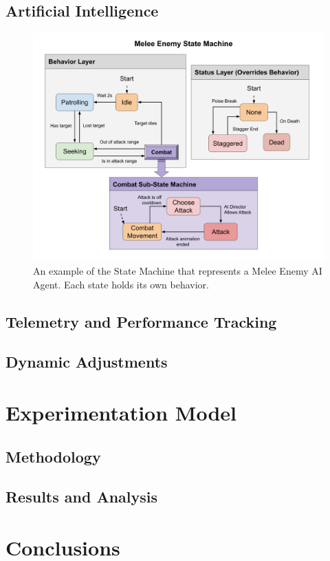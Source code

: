 \subsection{Artificial Intelligence}





\begin{figure}[!h]
    \caption{An example of the State Machine that represents a Melee Enemy AI Agent. Each state holds its own behavior.}
    \begin{center}
        \includegraphics[width=40em]{figures/fig-melee-ai-state-machine.png}
    \end{center}
    \label{fig:ex1}
\end{figure}

\subsection{Telemetry and Performance Tracking}

\subsection{Dynamic Adjustments}

\section{Experimentation Model}

\subsection{Methodology}

\subsection{Results and Analysis}

\section{Conclusions}



